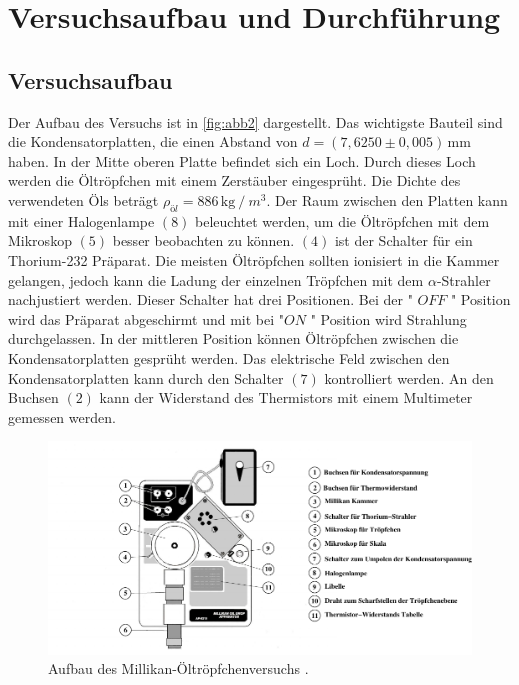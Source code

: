 \section{Versuchsaufbau und Durchführung}
\label{sec:Versuchsaufbau und Durchführung}

\subsection{Versuchsaufbau}
Der Aufbau des Versuchs ist in \autoref{fig:abb2} dargestellt. Das wichtigste Bauteil sind die Kondensatorplatten, die einen Abstand von $d = (7,6250 \pm 0,005) \, \unit{\milli\meter}$ haben.
In der Mitte oberen Platte befindet sich ein Loch. Durch dieses Loch werden die Öltröpfchen mit einem Zerstäuber eingesprüht.
Die Dichte des verwendeten Öls beträgt $\rho_{öl} = 886 \, \unit{\kilo\gram} \mathbin{/} m^3$. Der Raum zwischen den Platten kann mit einer Halogenlampe $(8)$ beleuchtet werden, um die Öltröpfchen mit dem Mikroskop $(5)$ besser beobachten zu können.
$(4)$ ist der Schalter für ein Thorium-232 Prä­pa­rat. Die meisten Öltröpfchen sollten ionisiert in die Kammer gelangen, jedoch kann die Ladung der einzelnen Tröpfchen mit dem $\alpha$-Strahler nachjustiert werden. Dieser Schalter hat drei Positionen.
Bei der " $OFF$ " Position wird das Prä­pa­rat abgeschirmt und mit bei "$ON$ " Position wird Strahlung durchgelassen. In der mittleren Position können Öltröpfchen zwischen die Kondensatorplatten gesprüht werden.
Das elektrische Feld zwischen den Kondensatorplatten kann durch den Schalter $(7)$ kontrolliert werden.
An den Buchsen $(2)$ kann der Widerstand des Thermistors mit einem Multimeter gemessen werden.


\begin{figure}[H]
    \centering
    \includegraphics[width=1.0\textwidth]{figures/Abb2.pdf}
    \caption{Aufbau des Millikan-Öltröpfchenversuchs \cite{ap12}.}
    \label{fig:abb2}
\end{figure}

